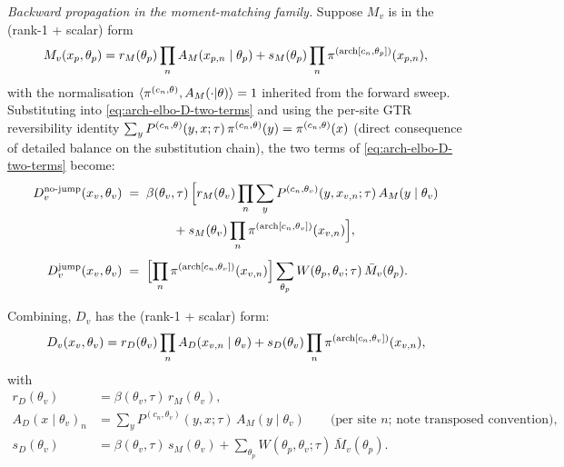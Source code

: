 \emph{Backward propagation in the moment-matching family.} Suppose
$M_v$ is in the (rank-1 + scalar) form
\begin{equation}
M_v(x_p, \theta_p) = r_M(\theta_p) \prod_n A_M(x_{p, n} \mid \theta_p)
    + s_M(\theta_p) \prod_n \pi^{(\mathrm{arch}[c_n, \theta_p])}(x_{p, n}),
    \label{eq:arch-elbo-M-form}
\end{equation}
with the normalisation
$\langle \pi^{(c_n, \theta)}, A_M(\cdot | \theta) \rangle = 1$
inherited from the forward sweep. Substituting into
\eqref{eq:arch-elbo-D-two-terms} and using the per-site GTR
reversibility identity
$\sum_{y} P^{(c_n, \theta)}(y, x; \tau)\, \pi^{(c_n, \theta)}(y)
= \pi^{(c_n, \theta)}(x)$
(direct consequence of detailed balance on the substitution chain),
the two terms of \eqref{eq:arch-elbo-D-two-terms} become:
\begin{align}
D_v^{\text{no-jump}}(x_v, \theta_v)
    &\;=\;
    \beta(\theta_v, \tau)\,
    \Bigl[
      r_M(\theta_v)
      \prod_n \sum_y P^{(c_n, \theta_v)}(y, x_{v, n}; \tau)\, A_M(y \mid \theta_v)
      \nonumber \\
    &\qquad\qquad
      + s_M(\theta_v)
      \prod_n \pi^{(\mathrm{arch}[c_n, \theta_v])}(x_{v, n})
    \Bigr], \\[0.4em]
D_v^{\text{jump}}(x_v, \theta_v)
    &\;=\;
    \Bigl[\prod_n \pi^{(\mathrm{arch}[c_n, \theta_v])}(x_{v, n})\Bigr]
    \sum_{\theta_p} W(\theta_p, \theta_v; \tau)\,\bar M_v(\theta_p).
\end{align}

Combining, $D_v$ has the (rank-1 + scalar) form:
\begin{equation}
D_v(x_v, \theta_v) = r_D(\theta_v) \prod_n A_D(x_{v, n} \mid \theta_v)
    + s_D(\theta_v) \prod_n \pi^{(\mathrm{arch}[c_n, \theta_v])}(x_{v, n}),
    \label{eq:arch-elbo-D-form}
\end{equation}
with
\begin{align}
r_D(\theta_v) &= \beta(\theta_v, \tau)\, r_M(\theta_v), \\
A_D(x \mid \theta_v)_n &= \sum_y P^{(c_n, \theta_v)}(y, x; \tau)\, A_M(y \mid \theta_v)
    \qquad\text{(per site $n$; note transposed convention)}, \\
s_D(\theta_v) &= \beta(\theta_v, \tau)\, s_M(\theta_v)
    + \sum_{\theta_p} W(\theta_p, \theta_v; \tau)\,\bar M_v(\theta_p).
    \label{eq:arch-elbo-sD}
\end{align}

